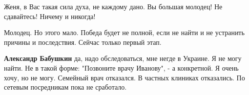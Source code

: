 \begin{itemize}
Женя, в Вас такая сила духа, не каждому дано. Вы большая молодец! Не
сдавайтесь! Ничему и никогда!

 
Молодец. Но этого мало. Победа будет не полной, если не найти и не устранить
причины и последствия. Сейчас только первый этап.

\begin{itemize}
 
\textbf{Александр Бабушкин} да, надо обследоваться, мне негде в Украине. Я не
могу найти. Не в такой форме: "Позвоните врачу Иванову", - а конкретной. Я
очень хочу, но не могу. Семейный врач отказался. В частных клиниках отказались.
По сетевым посредникам пока не сработало.
\end{itemize}

\end{itemize}


